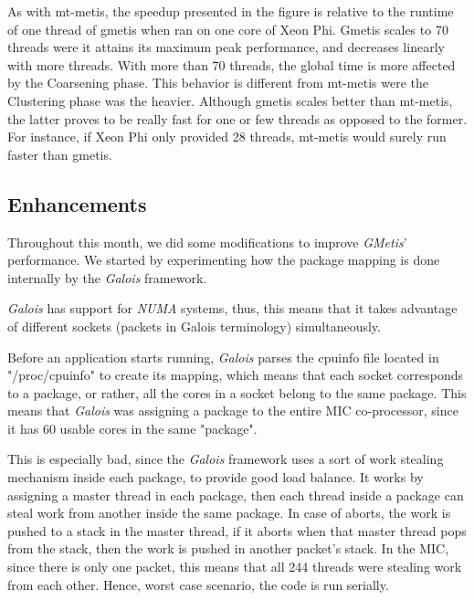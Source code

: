 \documentclass[abstract=on,9pt,twocolumn]{scrartcl}
\begin{document}
As with mt-metis, the speedup presented in the figure is relative to the
runtime of one thread of gmetis when ran on one core of Xeon Phi. Gmetis
scales to 70 threads were it attains its maximum peak performance, and
decreases linearly with more threads. With more than 70 threads, the
global time is more affected by the Coarsening phase. This behavior is
different from mt-metis were the Clustering phase was the heavier.
Although gmetis scales better than mt-metis, the latter proves to be
really fast for one or few threads as opposed to the former. For
instance, if Xeon Phi only provided 28 threads, mt-metis would
surely run faster than gmetis.

\subsection{Enhancements}
\label{sec:enhan}
Throughout this month, we did some modifications to improve
\textit{GMetis}' performance. We started by experimenting how the
package mapping is done internally by the \textit{Galois} framework.

\textit{Galois} has support for \textit{NUMA} systems, thus, this means
that it takes advantage of different sockets (packets in Galois
terminology) simultaneously.

Before an application starts running, \textit{Galois} parses the cpuinfo
file located in "/proc/cpuinfo" to create its mapping, which means that
each socket corresponds to a package, or rather, all the cores in a
socket belong to the same package.  This means that \textit{Galois} was
assigning a package to the entire MIC co-processor, since it has 60
usable cores in the same "package".

This is especially bad, since the \textit{Galois} framework uses a sort
of work stealing mechanism inside each package, to provide good load
balance. It works by assigning a master thread in each package, then
each thread inside a package can steal work from another inside the same
package. In case of aborts, the work is pushed to a stack in the master
thread, if it aborts when that master thread pops from the stack, then
the work is pushed in another packet's stack. In the MIC, since there is
only one packet, this means that all 244 threads were stealing work from
each other. Hence, worst case scenario, the code is run serially. 
\end{document}
